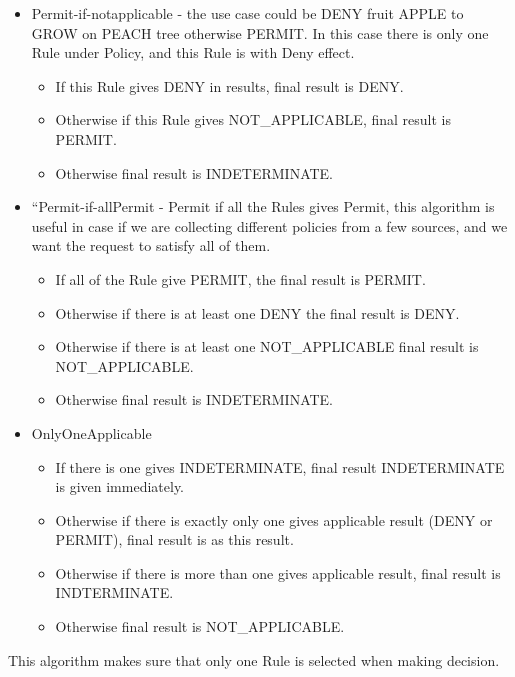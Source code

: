 \documentclass{article}
\newcommand\liststyleWWviiiNumxxi{%
\renewcommand\labelitemi{[F0B7?]}
\renewcommand\labelitemii{o}
\renewcommand\labelitemiii{[F0A7?]}
\renewcommand\labelitemiv{[F0B7?]}
}
\begin{document}
\liststyleWWviiiNumxxi
\begin{itemize}
\item {\color{black}
Permit-if-notapplicable - the use case could be {\textquotedbl}DENY
fruit APPLE to GROW on PEACH tree otherwise PERMIT{\textquotedbl}. In
this case there is only one Rule under Policy, and this Rule is with
{\textquotedbl}Deny{\textquotedbl} effect. }

\begin{itemize}
\item {\color{black}
If this Rule gives DENY in results, final result is DENY.}
\item {\color{black}
Otherwise if this Rule gives NOT\_APPLICABLE, final result is PERMIT.}
\item {\color{black}
Otherwise final result is INDETERMINATE. }
\end{itemize}
\item {\color{black}
{\textquotedblleft}Permit-if-allPermit{\textquotedbl} - Permit if all
the Rules gives Permit, this algorithm is useful in case if we are
collecting different policies from a few sources, and we want the
request to satisfy all of them.}

\begin{itemize}
\item {\color{black}
If all of the Rule give PERMIT, the final result is PERMIT.}
\item {\color{black}
Otherwise if there is at least one DENY the final result is DENY.}
\item {\color{black}
Otherwise if there is at least one NOT\_APPLICABLE final result is
NOT\_APPLICABLE.}
\item {\color{black}
Otherwise final result is INDETERMINATE.}
\end{itemize}
\item {\color{black}
OnlyOneApplicable}

\begin{itemize}
\item {\color{black}
If there is one gives INDETERMINATE, final result INDETERMINATE is given
immediately.}
\item {\color{black}
Otherwise if there is exactly only one gives applicable result (DENY or
PERMIT), final result is as this result.}
\item {\color{black}
Otherwise if there is more than one gives applicable result, final
result is INDTERMINATE.}
\item {\color{black}
Otherwise final result is NOT\_APPLICABLE.}
\end{itemize}
\end{itemize}
{\color{black}
This algorithm makes sure that only one Rule is selected when making
decision.}
\end{document}
